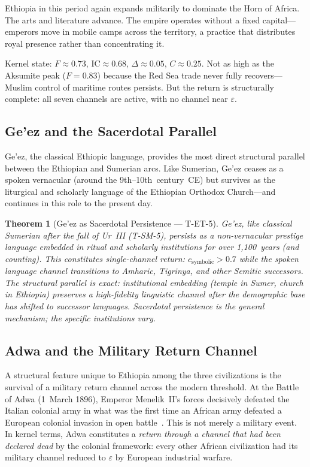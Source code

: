 \documentclass[
  aps,
  prd,
  twocolumn,
  superscriptaddress,
  nofootinbib,
  floatfix
]{revtex4-2}
\newtheorem{theorem}{Theorem}
\newcommand{\eps}{\varepsilon}
\newcommand{\IC}{\mathrm{IC}}
\begin{document}
Ethiopia in this period again expands militarily to
dominate the Horn of Africa.  The arts and
literature advance.  The empire operates without a
fixed capital---emperors move in mobile camps
across the territory, a practice that distributes
royal presence rather than concentrating it.

Kernel state: $F \approx 0.73$, $\IC \approx 0.68$,
$\Delta \approx 0.05$, $C \approx 0.25$.  Not as
high as the Aksumite peak ($F = 0.83$) because the
Red Sea trade never fully recovers---Muslim control
of maritime routes persists.  But the return is
structurally complete: all seven channels are active,
with no channel near $\eps$.

\subsection{Ge'ez and the Sacerdotal
Parallel}\label{sec:geez}

Ge'ez, the classical Ethiopic language, provides the
most direct structural parallel between the
Ethiopian and Sumerian arcs.  Like Sumerian, Ge'ez
ceases as a spoken vernacular (around the
9th--10th~century~CE) but survives as the liturgical
and scholarly language of the Ethiopian Orthodox
Church---and continues in this role to the present
day.

\begin{theorem}[Ge'ez as Sacerdotal Persistence ---
T-ET-5]\label{thm:geez}
Ge'ez, like classical Sumerian after the fall of
Ur~III (T-SM-5), persists as a non-vernacular
prestige language embedded in ritual and scholarly
institutions for over 1{,}100~years (and counting).
This constitutes single-channel return:
$c_{\mathrm{symbolic}} > 0.7$ while the spoken
language channel transitions to Amharic, Tigrinya,
and other Semitic successors.  The structural
parallel is exact: institutional embedding (temple
in Sumer, church in Ethiopia) preserves a
high-fidelity linguistic channel after the
demographic base has shifted to successor
languages.  Sacerdotal persistence is the general
mechanism; the specific institutions vary.
\end{theorem}

\subsection{Adwa and the Military Return
Channel}\label{sec:adwa}

A structural feature unique to Ethiopia among the
three civilizations is the survival of a military
return channel across the modern threshold.  At the
Battle of Adwa (1~March 1896), Emperor Menelik~II's
forces decisively defeated the Italian colonial army
in what was the first time an African army defeated
a European colonial invasion in open
battle~\cite{marcus2002ethiopia}.  This is not
merely a military event.  In kernel terms, Adwa
constitutes a \emph{return through a channel that
had been declared dead} by the colonial framework:
every other African civilization had its military
channel reduced to $\eps$ by European industrial
warfare.
\end{document}
